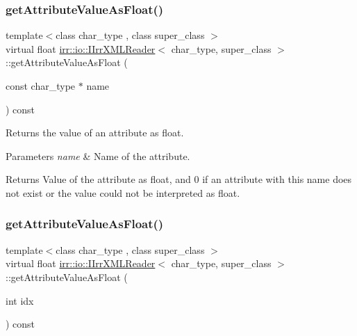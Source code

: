 \subsubsection{\texorpdfstring{get\+Attribute\+Value\+As\+Float()}{getAttributeValueAsFloat()}\hspace{0.1cm}{\footnotesize\ttfamily [2/4]}}
{\footnotesize\ttfamily template$<$class char\+\_\+type , class super\+\_\+class $>$ \\
virtual float \hyperlink{classirr_1_1io_1_1IIrrXMLReader}{irr\+::io\+::\+I\+Irr\+X\+M\+L\+Reader}$<$ char\+\_\+type, super\+\_\+class $>$\+::get\+Attribute\+Value\+As\+Float (\begin{DoxyParamCaption}\item[{const char\+\_\+type $\ast$}]{name }\end{DoxyParamCaption}) const\hspace{0.3cm}{\ttfamily [pure virtual]}}



Returns the value of an attribute as float. 


\begin{DoxyParams}{Parameters}
{\em name} & Name of the attribute. \\
\hline
\end{DoxyParams}
\begin{DoxyReturn}{Returns}
Value of the attribute as float, and 0 if an attribute with this name does not exist or the value could not be interpreted as float. 
\end{DoxyReturn}
\mbox{\label{classirr_1_1io_1_1IIrrXMLReader_a3a01b3cec9db01d00928074846d39add}} 
\subsubsection{\texorpdfstring{get\+Attribute\+Value\+As\+Float()}{getAttributeValueAsFloat()}\hspace{0.1cm}{\footnotesize\ttfamily [3/4]}}
{\footnotesize\ttfamily template$<$class char\+\_\+type , class super\+\_\+class $>$ \\
virtual float \hyperlink{classirr_1_1io_1_1IIrrXMLReader}{irr\+::io\+::\+I\+Irr\+X\+M\+L\+Reader}$<$ char\+\_\+type, super\+\_\+class $>$\+::get\+Attribute\+Value\+As\+Float (\begin{DoxyParamCaption}\item[{int}]{idx }\end{DoxyParamCaption}) const\hspace{0.3cm}{\ttfamily [pure virtual]}}



